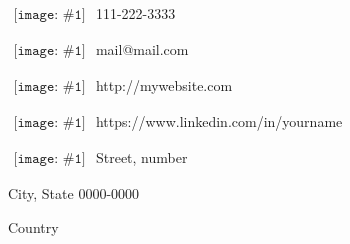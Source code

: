 
\newcommand{\ContactEntry}[2]{
	\normalsize
	$\begin{array}{l}
	{\texttt{[image: \#1]}}
	\end{array}
	$ #2
}


\begin{minipage}[t]{0.66\textwidth}
	\vspace{1pt}
	\begin{multicols}{2}
		\ContactEntry{images/green/ic_phone}{111-222-3333}

		\ContactEntry{images/green/ic_email}{mail@mail.com}

		\ContactEntry{images/green/ic_web}{http://mywebsite.com}

		\ContactEntry{images/green/ic_people}{https://www.linkedin.com/in/yourname}

		\columnbreak

		\ContactEntry{images/green/ic_home}{Street, number

		\hspace{22pt}City, State 0000-0000

		\hspace{22pt}Country}
	\end{multicols}
	\vspace{0.1pt}
\end{minipage}